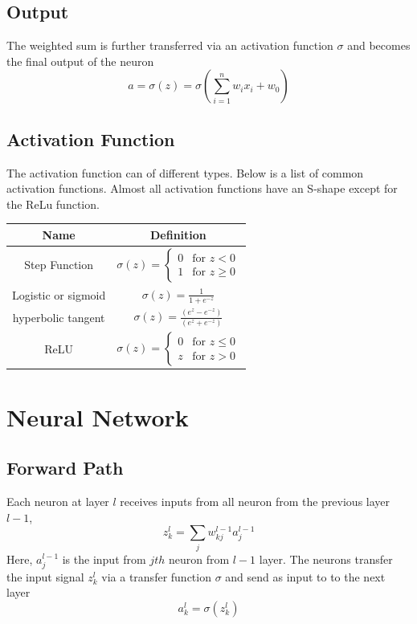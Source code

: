 \documentclass[12pt, oneside]{article}
\begin{document}
\subsection{Output}
The weighted sum is further transferred via an activation function $\sigma$ and becomes the final output of the neuron
\begin{equation}
a=\sigma(z)=\sigma(\sum\limits_{i=1}^{n}w_i x_i+w_0)
\end{equation}

\subsection{Activation Function}
The activation function can of different types.  Below is a list of common activation functions. Almost all activation functions have an S-shape except for the ReLu function.
\begin{center}
\bgroup
\def\arraystretch{2.5}%
\begin{tabular}{c|c} 
Name & Definition\\
\hline
Step Function & $\sigma (z)={\begin{cases}0&{\text{for }}z<0\\1&{\text{for }}z\geq 0\end{cases}}$\\
\hline
Logistic or sigmoid & $\sigma(z)={\frac {1}{1+e^{-z}}}$\\
\hline
hyperbolic tangent &$\sigma(z)={\frac {(e^{z}-e^{-z})}{(e^{z}+e^{-z})}}$\\
\hline
ReLU & $\sigma(z)=\begin{cases}0&{\text{for }}z\leq 0\\z&{\text{for }}z>0\end{cases}$
\end{tabular}
\egroup
\end{center}


\section{Neural Network}
\subsection{Forward Path}
Each neuron at layer ${l}$ receives inputs from all neuron from the previous layer ${l-1}$,
\begin{equation}
{z_k^l=\sum_jw^{l-1}_{kj}a_j^{l-1}}
\end{equation}
Here, $a_j^{l-1}$ is the input from $jth$ neuron from $l-1$ layer. The neurons transfer the input signal $z_k^l$ via a transfer function $\sigma$ and send as input to to the next layer
\begin{equation}
a_k^l=\sigma(z_k^l)
\end{equation}
\end{document}
